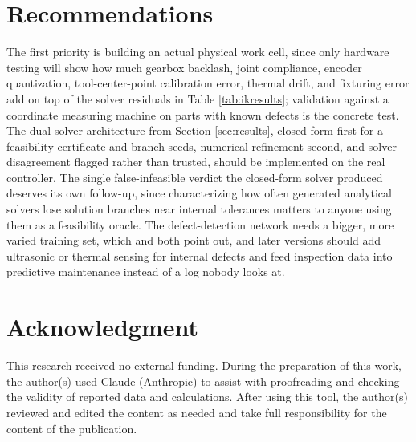 \documentclass[conference]{IEEEtran}
\begin{document}
\section{Recommendations}
The first priority is building an actual physical work cell, since only hardware testing will show how much gearbox backlash, joint compliance, encoder quantization, tool-center-point calibration error, thermal drift, and fixturing error add on top of the solver residuals in Table \ref{tab:ikresults}; validation against a coordinate measuring machine on parts with known defects is the concrete test. The dual-solver architecture from Section \ref{sec:results}, closed-form first for a feasibility certificate and branch seeds, numerical refinement second, and solver disagreement flagged rather than trusted, should be implemented on the real controller. The single false-infeasible verdict the closed-form solver produced deserves its own follow-up, since characterizing how often generated analytical solvers lose solution branches near internal tolerances matters to anyone using them as a feasibility oracle. The defect-detection network needs a bigger, more varied training set, which \cite{ref3} and \cite{ref4} both point out, and later versions should add ultrasonic or thermal sensing for internal defects and feed inspection data into predictive maintenance instead of a log nobody looks at.

\section*{Acknowledgment}
This research received no external funding. During the preparation of this work, the author(s) used Claude (Anthropic) to assist with proofreading and checking the validity of reported data and calculations. After using this tool, the author(s) reviewed and edited the content as needed and take full responsibility for the content of the publication.
\end{document}
